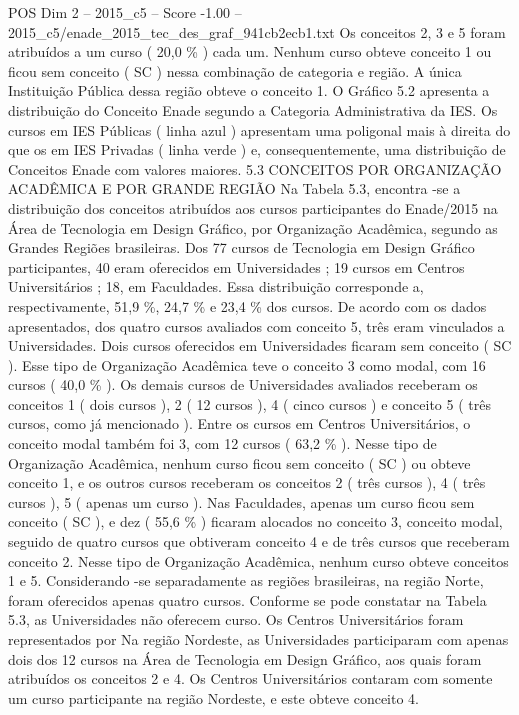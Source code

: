 \begin{textsample}{POS Dim 2 – 2015\_c5 – Score -1.00 – 2015\_c5/enade\_2015\_tec\_des\_graf\_941cb2ecb1.txt}
Os conceitos 2, 3 e 5 foram atribuídos a um curso ( 20,0 \% ) cada um.
Nenhum curso obteve conceito 1 ou ficou sem conceito ( SC ) nessa combinação de categoria e região.
A única Instituição Pública dessa região obteve o conceito 1.
O Gráfico 5.2 apresenta a distribuição do Conceito Enade segundo a Categoria Administrativa da IES.
Os cursos em IES Públicas ( linha azul ) apresentam uma poligonal mais à direita do que os em IES Privadas ( linha verde ) e, consequentemente, uma distribuição de Conceitos Enade com valores maiores. 5.3 CONCEITOS POR ORGANIZAÇÃO ACADÊMICA E POR GRANDE REGIÃO Na Tabela 5.3, encontra -se a distribuição dos conceitos atribuídos aos cursos participantes do Enade/2015 na Área de Tecnologia em Design Gráfico, por Organização Acadêmica, segundo as Grandes Regiões brasileiras.
Dos 77 cursos de Tecnologia em Design Gráfico participantes, 40 eram oferecidos em Universidades ; 19 cursos em Centros Universitários ; 18, em Faculdades.
Essa distribuição corresponde a, respectivamente, 51,9 \%, 24,7 \% e 23,4 \% dos cursos.
De acordo com os dados apresentados, dos quatro cursos avaliados com conceito 5, três eram vinculados a Universidades.
Dois cursos oferecidos em Universidades ficaram sem conceito ( SC ).
Esse tipo de Organização Acadêmica teve o conceito 3 como modal, com 16 cursos ( 40,0 \% ).
Os demais cursos de Universidades avaliados receberam os conceitos 1 ( dois cursos ), 2 ( 12 cursos ), 4 ( cinco cursos ) e conceito 5 ( três cursos, como já mencionado ).
Entre os cursos em Centros Universitários, o conceito modal também foi 3, com 12 cursos ( 63,2 \% ).
Nesse tipo de Organização Acadêmica, nenhum curso ficou sem conceito ( SC ) ou obteve conceito 1, e os outros cursos receberam os conceitos 2 ( três cursos ), 4 ( três cursos ), 5 ( apenas um curso ).
Nas Faculdades, apenas um curso ficou sem conceito ( SC ), e dez ( 55,6 \% ) ficaram alocados no conceito 3, conceito modal, seguido de quatro cursos que obtiveram conceito 4 e de três cursos que receberam conceito 2.
Nesse tipo de Organização Acadêmica, nenhum curso obteve conceitos 1 e 5.
Considerando -se separadamente as regiões brasileiras, na região Norte, foram oferecidos apenas quatro cursos.
Conforme se pode constatar na Tabela 5.3, as Universidades não oferecem curso.
Os Centros Universitários foram representados por Na região Nordeste, as Universidades participaram com apenas dois dos 12 cursos na Área de Tecnologia em Design Gráfico, aos quais foram atribuídos os conceitos 2 e 4.
Os Centros Universitários contaram com somente um curso participante na região Nordeste, e este obteve conceito 4.

\end{textsample}
